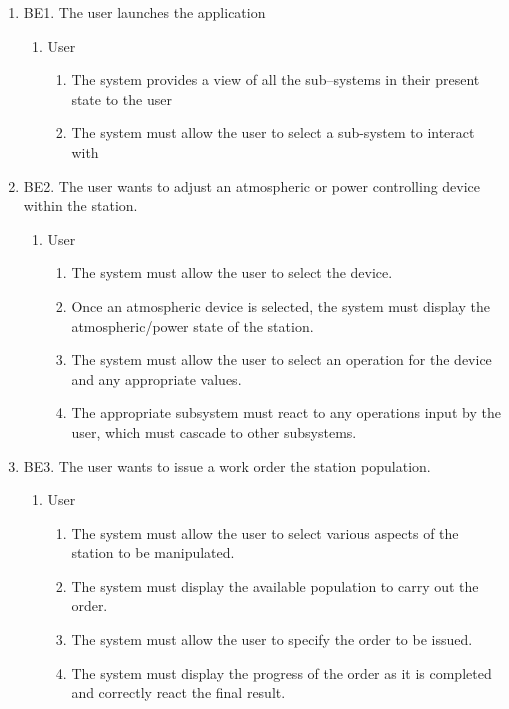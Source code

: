 \documentclass[]{article}
\begin{document}
\begin{enumerate}
	\item BE1. The user launches the application
	\begin{enumerate}
		\item User
			\begin{enumerate}
				\item The system provides a view of all the sub--systems in their present state to the user
				\item The system must allow the user to select a sub-system to interact with
			\end{enumerate}
	\end{enumerate}
	\item BE2. The user wants to adjust an atmospheric or power controlling device within the station.
	\begin{enumerate}
		\item User
			\begin{enumerate}
				\item The system must allow the user to select the device.
				\item Once an atmospheric device is selected, the system must display the atmospheric/power state of the station.
				\item The system must allow the user to select an operation for the device and any appropriate values.
				\item The appropriate subsystem must react to any operations input by the user, which must cascade to other subsystems.
			\end{enumerate}
	\end{enumerate}
	\item BE3. The user wants to issue a work order the station population.
	\begin{enumerate}
		\item User
			\begin{enumerate}
				\item The system must allow the user to select various aspects of the station to be manipulated.
				\item The system must display the available population to carry out the order.
				\item The system must allow the user to specify the order to be issued.
				\item The system must display the progress of the order as it is completed and correctly react the final result.
			\end{enumerate}
	\end{enumerate}

\end{enumerate}
\end{document}
